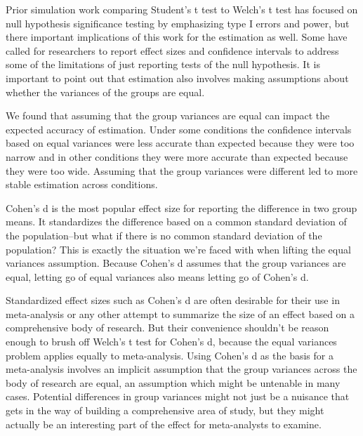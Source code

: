 \documentclass[man,a4paper,noextraspace,apacite]{apa6}
\begin{document}
    Prior simulation work comparing Student's t test to Welch's t test has focused on null hypothesis significance testing by emphasizing type I errors and power, but there important implications of this work for the estimation as well. Some have called for researchers to report effect sizes and confidence intervals to address some of the limitations of just reporting tests of the null hypothesis. It is important to point out that estimation also involves making assumptions about whether the variances of the groups are equal.
    
    We found that assuming that the group variances are equal can impact the expected accuracy of estimation. Under some conditions the confidence intervals based on equal variances were less accurate than expected because they were too narrow and in other conditions they were more accurate than expected because they were too wide. Assuming that the group variances were different led to more stable estimation across conditions.
    
    Cohen's d is the most popular effect size for reporting the difference in two group means. It standardizes the difference based on a common standard deviation of the population--but what if there is no common standard deviation of the population? This is exactly the situation we're faced with when lifting the equal variances assumption. Because Cohen's d assumes that the group variances are equal, letting go of equal variances also means letting go of Cohen's d. 
    
    Standardized effect sizes such as Cohen's d are often desirable for their use in meta-analysis or any other attempt to summarize the size of an effect based on a comprehensive body of research. But their convenience shouldn't be reason enough to brush off Welch's t test for Cohen's d, because the equal variances problem applies equally to meta-analysis. Using Cohen's d as the basis for a meta-analysis involves an implicit assumption that the group variances across the body of research are equal, an assumption which might be untenable in many cases. Potential differences in group variances might not just be a nuisance that gets in the way of building a comprehensive area of study, but they might actually be an interesting part of the effect for meta-analysts to examine. 
    
\end{document}
